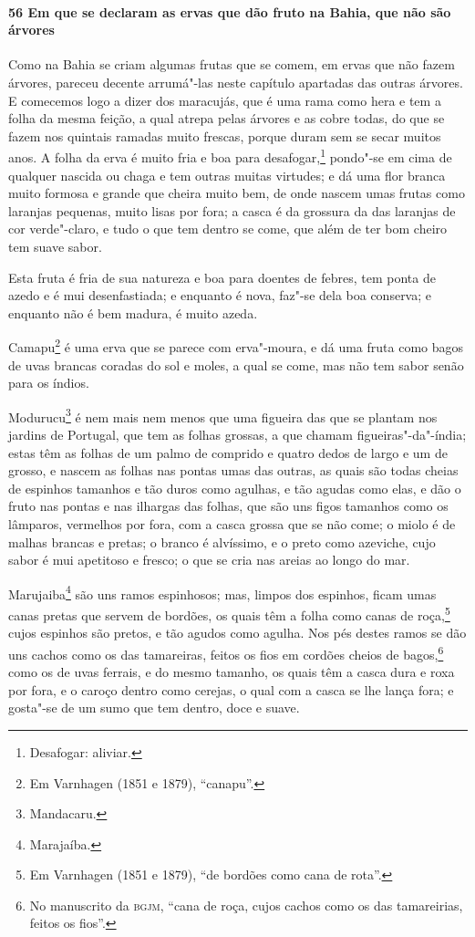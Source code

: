 \begin{linenumbers}
\paragraph{56 Em que se declaram as ervas que dão fruto na Bahia, que não são árvores}\quad
Como na Bahia se criam algumas frutas que se comem, em ervas que não fazem árvores,
pareceu decente arrumá"-las neste capítulo apartadas das outras árvores. E comecemos logo a
dizer dos maracujás, que é uma rama como hera e tem a folha da mesma feição, a qual atrepa
pelas árvores e as cobre todas, do que se fazem nos quintais ramadas muito frescas, porque
duram sem se secar muitos anos. A folha da erva é muito fria e boa para
desafogar,\footnote{ Desafogar: aliviar.} pondo"-se em cima de qualquer nascida ou chaga e
tem outras muitas virtudes; e dá uma flor branca muito formosa e grande que cheira muito
bem, de onde nascem umas frutas como laranjas pequenas, muito lisas por fora; a casca é da
grossura da das laranjas de cor verde"-claro, e tudo o que tem dentro se come, que além de
ter bom cheiro tem suave sabor.

Esta fruta é fria de sua natureza e boa para doentes de febres, tem ponta de azedo e é mui
desenfastiada; e enquanto é nova, faz"-se dela boa conserva; e enquanto não é bem madura, é
muito azeda.

Camapu\footnote{ Em Varnhagen (1851 e 1879), ``canapu''.} é uma erva que se parece com
erva"-moura, e dá uma fruta como bagos de uvas brancas coradas do sol e moles, a qual se
come, mas não tem sabor senão para os índios.

Modurucu\footnote{ Mandacaru.} é nem mais nem menos que uma figueira das que se plantam
nos jardins de Portugal, que tem as folhas grossas, a que chamam figueiras"-da"-índia; estas
têm as folhas de um palmo de comprido e quatro dedos de largo e um de grosso, e nascem as
folhas nas pontas umas das outras, as quais são todas cheias de espinhos tamanhos e tão
duros como agulhas, e tão agudas como elas, e dão o fruto nas pontas e nas ilhargas das
folhas, que são uns figos tamanhos como os lâmparos, vermelhos por fora, com a casca
grossa que se não come; o miolo é de malhas brancas e pretas; o branco é alvíssimo, e o
preto como azeviche, cujo sabor é mui apetitoso e fresco; o que se cria nas areias ao
longo do mar.

Marujaiba\footnote{ Marajaíba.} são uns ramos espinhosos; mas, limpos dos espinhos, ficam
umas canas pretas que servem de bordões, os quais têm a folha como canas de
roça,\footnote{ Em Varnhagen (1851 e 1879), ``de bordões como cana de rota''.} cujos
espinhos são pretos, e tão agudos como agulha. Nos pés destes ramos se dão uns cachos como
os das tamareiras, feitos os fios em cordões cheios de bagos,\footnote{ No manuscrito da
\textsc{bgjm}, ``cana de roça, cujos cachos como os das tamareirias, feitos os fios''.}
como os de uvas ferrais, e do mesmo tamanho, 
os quais têm a casca dura e roxa por fora, e o caroço dentro como cerejas, o
qual com a casca se lhe lança fora; e gosta"-se de um sumo que tem dentro, doce e suave.


\end{linenumbers}
